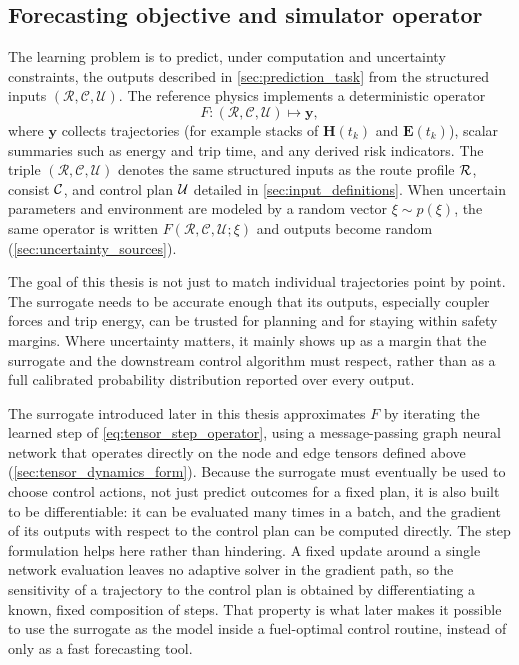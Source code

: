 \subsection{Forecasting objective and simulator operator}
\label{sec:forecasting_objective}

The learning problem is to predict, under computation and uncertainty constraints, the outputs described in \cref{sec:prediction_task} from the structured inputs $(\mathcal{R}, \mathcal{C}, \mathcal{U})$.
The reference physics implements a deterministic operator
\begin{equation}
    F : (\mathcal{R}, \mathcal{C}, \mathcal{U}) \mapsto \mathbf{y},
    \label{eq:simulator_operator}
\end{equation}
where $\mathbf{y}$ collects trajectories (for example stacks of $\mathbf{H}(t_k)$ and $\mathbf{E}(t_k)$), scalar summaries such as energy and trip time, and any derived risk indicators.
The triple $(\mathcal{R}, \mathcal{C}, \mathcal{U})$ denotes the same structured inputs as the route profile $\mathcal{R}$, consist $\mathcal{C}$, and control plan $\mathcal{U}$ detailed in \cref{sec:input_definitions}.
When uncertain parameters and environment are modeled by a random vector $\xi \sim p(\xi)$, the same operator is written $F(\mathcal{R}, \mathcal{C}, \mathcal{U}; \xi)$ and outputs become random (\cref{sec:uncertainty_sources}).

The goal of this thesis is not just to match individual trajectories point by point.
The surrogate needs to be accurate enough that its outputs, especially coupler forces and trip energy, can be trusted for planning and for staying within safety margins.
Where uncertainty matters, it mainly shows up as a margin that the surrogate and the downstream control algorithm must respect, rather than as a full calibrated probability distribution reported over every output.

The surrogate introduced later in this thesis approximates $F$ by iterating the learned step of \cref{eq:tensor_step_operator}, using a message-passing graph neural network that operates directly on the node and edge tensors defined above (\cref{sec:tensor_dynamics_form}).
Because the surrogate must eventually be used to choose control actions, not just predict outcomes for a fixed plan, it is also built to be differentiable: it can be evaluated many times in a batch, and the gradient of its outputs with respect to the control plan can be computed directly.
The step formulation helps here rather than hindering.
A fixed update around a single network evaluation leaves no adaptive solver in the gradient path, so the sensitivity of a trajectory to the control plan is obtained by differentiating a known, fixed composition of steps.
That property is what later makes it possible to use the surrogate as the model inside a fuel-optimal control routine, instead of only as a fast forecasting tool.

